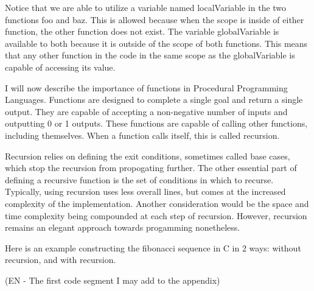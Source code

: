 Notice that we are able to utilize a variable named localVariable in the two functions foo and baz.
This is allowed because when the scope is inside of either function, the other function does not exist.
The variable globalVariable is available to both because it is outside of the scope of both functions.
This means that any other function in the code in the same scope as the globalVariable is capable of accessing its value.

I will now describe the importance of functions in Procedural Programming Languages.
Functions are designed to complete a single goal and return a single output.
They are capable of accepting a non-negative number of inputs and outputting 0 or 1 outputs.
These functions are capable of calling other functions, including themselves.
When a function calls itself, this is called recursion.

Recursion relies on defining the exit conditions, sometimes called base cases, which stop the recursion from propogating further.
The other essential part of defining a recursive function is the set of conditions in which to recurse.
Typically, using recursion uses less overall lines, but comes at the increased complexity of the implementation.
Another consideration would be the space and time complexity being compounded at each step of recursion.
However, recursion remains an elegant approach towards progamming nonetheless.

Here is an example constructing the fibonacci sequence in C in 2 ways: without recursion, and with recursion.

(EN - The first code segment I may add to the appendix)

